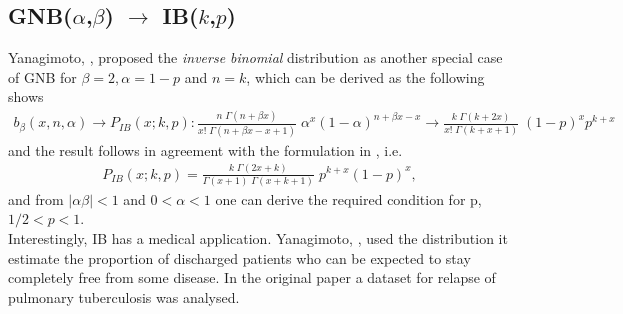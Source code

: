 \subsection*{GNB($\alpha$,$\beta$) $\rightarrow$ IB($k$,$p$)}
Yanagimoto, \cite{yanagimoto1989inverse}, proposed the \emph{inverse binomial} 
distribution as another special case of GNB for $\beta = 2, \alpha=1-p$ and $n=k$, which 
can be derived as the following shows 
\begin{align*}
b_{\beta}(x,n,\alpha) \rightarrow P_{I\!B}(x;k,p):
 \frac{n \; \Gamma(n+\beta x)}{x! \;\Gamma(n + \beta x - x +1)}  \; \alpha^x (1-\alpha)^{n+\beta x-x} \rightarrow 
\frac{k \; \Gamma(k + 2x)}{x! \;\Gamma(k + x + 1)}  \; (1-p)^x p^{k+x} 
\end{align*}
and the result follows in agreement with the formulation in \cite{yanagimoto1989inverse}, i.e.
\begin{align*}
P_{I\!B}(x;k,p) = \frac{k \; \Gamma(2x + k)}{\Gamma(x+1) \;\Gamma(x + k + 1)}  \; p^{k+x} (1-p)^x ,
\end{align*}
and from $|\alpha \beta| < 1$ and $0<\alpha<1$ one can derive the required condition for p, $1/2 < p < 1$.\\
Interestingly, IB has a medical application. Yanagimoto, \cite{yanagimoto1989inverse}, 
used the distribution it estimate the proportion of discharged patients who can be 
expected to stay completely free from some disease. In the original paper a dataset
for relapse of pulmonary tuberculosis was analysed.




